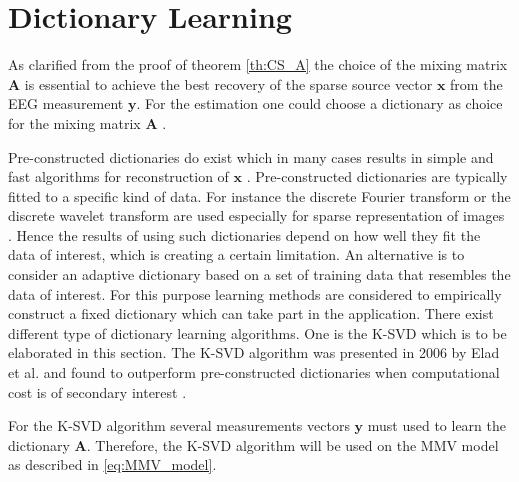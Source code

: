 \section{Dictionary Learning}\label{sec:dictionarylearning}
As clarified from the proof of theorem \ref{th:CS_A} the choice of the mixing matrix $\mathbf{A}$ is essential to achieve the best recovery of the sparse source vector $\mathbf{x}$ from the EEG measurement $\mathbf{y}$. 
For the estimation one could choose a dictionary as choice for the mixing matrix $\mathbf{A}$ .

Pre-constructed dictionaries do exist which in many cases results in simple and fast algorithms for reconstruction of $\mathbf{x}$ \cite{Elad_book}. 
Pre-constructed dictionaries are typically fitted to a specific kind of data. 
For instance the discrete Fourier transform or the discrete wavelet transform are used especially for sparse representation of images \cite{Elad_book}. 
Hence the results of using such dictionaries depend on how well they fit the data of interest, which is creating a certain limitation. 
An alternative is to consider an adaptive dictionary based on a set of training data that resembles the data of interest. 
For this purpose learning methods are considered to empirically construct a fixed dictionary which can take part in the application. 
There exist different type of dictionary learning algorithms. One is the K-SVD which is to be elaborated in this section. The K-SVD algorithm was presented in 2006 by Elad et al. and found to outperform pre-constructed dictionaries when computational cost is of secondary interest \cite{Elad2006}. 

For the K-SVD algorithm several measurements vectors $\mathbf{y}$ must used to learn the dictionary $\mathbf{A}$. Therefore, the K-SVD algorithm will be used on the MMV model as described in \eqref{eq:MMV_model}.

